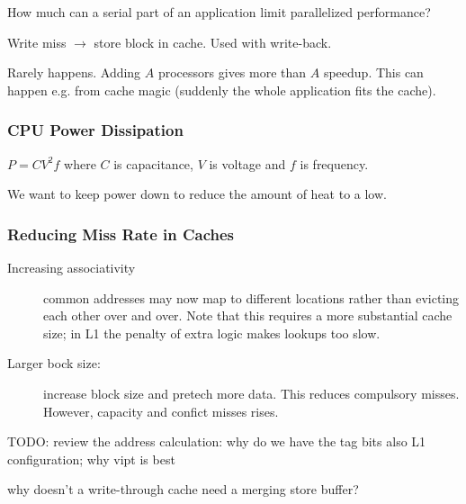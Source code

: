 \begin{definition}
    How much can a serial part of an application limit parallelized performance?
\end{definition}


\begin{definition}
    Write miss $\rightarrow$ store block in cache. Used with write-back.
\end{definition}



\begin{definition}
   Rarely happens. Adding $A$ processors gives more than $A$ speedup. This can happen e.g. from cache magic (suddenly the whole application fits the cache). 
\end{definition}


\subsubsection{CPU Power Dissipation}\label{sec:powerdissipation}
    $P = CV^{2}f$
    where $C$ is capacitance, $V$ is voltage and $f$ is frequency.

    We want to keep power down to reduce the amount of heat to a low.

\subsubsection{Reducing Miss Rate in Caches}
\begin{description}
    \item[Increasing associativity] common addresses may now map to different locations rather than evicting each other over and over. Note that this requires 
    a more substantial cache size; in L1 the penalty of extra logic makes lookups
    too slow.
    \item[Larger bock size:] increase block size and pretech more data. This
    reduces compulsory misses. However, capacity and confict misses rises.
\end{description}

TODO: review the address calculation: why do we have the tag bits
    also L1 configuration; why vipt is best

why doesn't a write-through cache need a merging store buffer?

